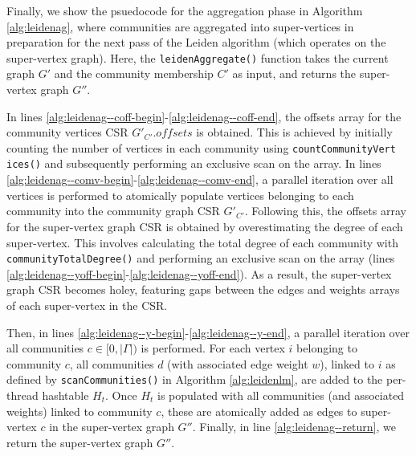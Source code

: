Finally, we show the psuedocode for the aggregation phase in Algorithm \ref{alg:leidenag}, where communities are aggregated into super-vertices in preparation for the next pass of the Leiden algorithm (which operates on the super-vertex graph). Here, the \texttt{leidenAggregate()} function takes the current graph $G'$ and the community membership $C'$ as input, and returns the super-vertex graph $G''$.

In lines \ref{alg:leidenag--coff-begin}-\ref{alg:leidenag--coff-end}, the offsets array for the community vertices CSR $G'_{C'}.offsets$ is obtained. This is achieved by initially counting the number of vertices in each community using \texttt{countCommunityVert} \texttt{ices()} and subsequently performing an exclusive scan on the array. In lines \ref{alg:leidenag--comv-begin}-\ref{alg:leidenag--comv-end},  a parallel iteration over all vertices is performed to atomically populate vertices belonging to each community into the community graph CSR $G'_{C'}$. Following this, the offsets array for the super-vertex graph CSR is obtained by overestimating the degree of each super-vertex. This involves calculating the total degree of each community with \texttt{communityTotalDegree()} and performing an exclusive scan on the array (lines \ref{alg:leidenag--yoff-begin}-\ref{alg:leidenag--yoff-end}). As a result, the super-vertex graph CSR becomes holey, featuring gaps between the edges and weights arrays of each super-vertex in the CSR.

Then, in lines \ref{alg:leidenag--y-begin}-\ref{alg:leidenag--y-end}, a parallel iteration over all communities $c \in [0, |\Gamma|)$ is performed. For each vertex $i$ belonging to community $c$, all communities $d$ (with associated edge weight $w$), linked to $i$ as defined by \texttt{scanCommunities()} in Algorithm \ref{alg:leidenlm}, are added to the per-thread hashtable $H_t$. Once $H_t$ is populated with all communities (and associated weights) linked to community $c$, these are atomically added as edges to super-vertex $c$ in the super-vertex graph $G''$. Finally, in line \ref{alg:leidenag--return}, we return the super-vertex graph $G''$.
